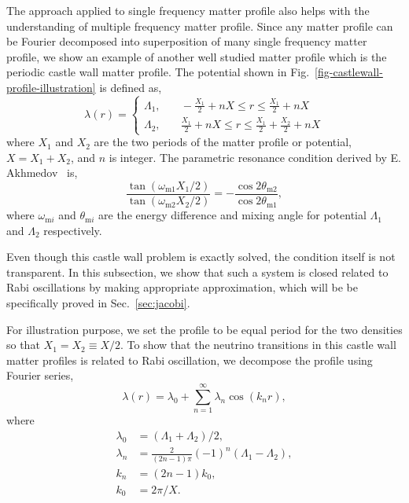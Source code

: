 \documentclass[%
reprint,
 amsmath,amssymb,
 aps,
]{revtex4-1}
\begin{document}
The approach applied to single frequency matter profile also helps with the understanding of multiple frequency matter profile. Since any matter profile can be Fourier decomposed into superposition of many single frequency matter profile, we show an example of another well studied matter profile which is the periodic castle wall matter profile. The potential shown in Fig.~\ref{fig-castlewall-profile-illustration} is defined as,
\begin{equation}
    \lambda(r) = \begin{cases} 
\Lambda_1, &\quad -\frac{X_1}{2}+nX\le r\le \frac{X_1}{2}+nX \\
\Lambda_2, &\quad \frac{X_1}{2}+nX\le r\le \frac{X_1}{2}+\frac{X_2}{2} +nX
\end{cases}
\label{eq-castle-wall-potential}
\end{equation}
where $X_1$ and $X_2$ are the two periods of the matter profile or potential, $X=X_1+X_2$, and $n$ is integer. The parametric resonance condition derived by E. Akhmedov~\cite{Akhmedov2000} is,
\begin{equation}
    \frac{\tan (\omega_{\mathrm m1}X_1/2)}{\tan (\omega_{\mathrm m2}X_2/2)} = - \frac{\cos 2\theta_{\mathrm m2}}{\cos 2\theta_{\mathrm m1}},
\end{equation}
where $\omega_{\mathrm{m}i}$ and $\theta_{\mathrm{m}i}$ are the energy difference and mixing angle for potential $\Lambda_1$ and $\Lambda_2$ respectively.



Even though this castle wall problem is exactly solved, the condition itself is not transparent. In this subsection, we show that such a system is closed related to Rabi oscillations by making appropriate approximation, which will be be specifically proved in Sec.~\ref{sec:jacobi}.

For illustration purpose, we set the profile to be equal period for the two densities so that $X_1=X_2\equiv X/2$. To show that the neutrino transitions in this castle wall matter profiles is related to Rabi oscillation, we decompose the profile using Fourier series,
\begin{equation}
\lambda(r) = \lambda_0 + \sum_{n=1}^{\infty} \lambda_n \cos\left( k_n  r \right),
\end{equation}
where 
\begin{align*}
\lambda_0 &= (\Lambda_1 + \Lambda_2)/2, \\
\lambda_n & = \frac{2}{(2n-1)\pi}  (-1)^n  \left( \Lambda_1 -  \Lambda_2 \right),\\
k_n &= (2n-1)k_0, \\
k_0 &= 2\pi/X.
\end{align*}
\end{document}
